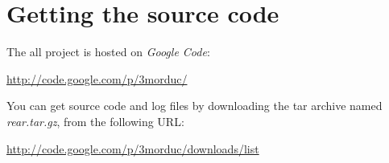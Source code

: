 \section{Getting the source code}
\label{sec:gettingsourcecode}

The all project is hosted on \textit{Google Code}:
%

%
\vspace{20pt}
\url{http://code.google.com/p/3morduc/}
\vspace{20pt}

%
You can get source code and log files by downloading
the tar archive named \textit{rear.tar.gz}, from the
following URL:
%

%
\vspace{20pt}
\url{http://code.google.com/p/3morduc/downloads/list}

